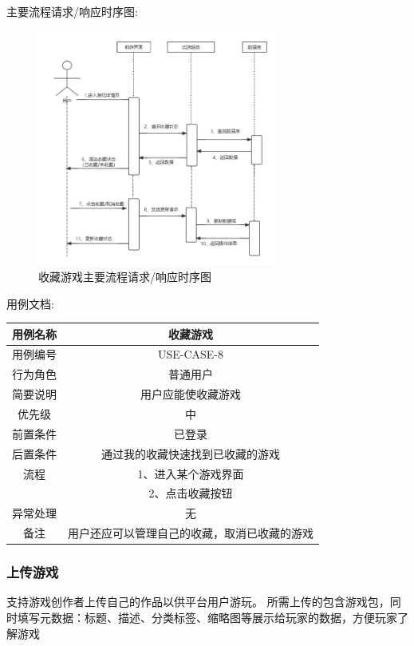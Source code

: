 \documentclass[12pt]{ctexart} %
\begin{document}
主要流程请求/响应时序图:
\begin{figure}[ht]
  \centering
  \includegraphics[width=0.7\textwidth]{yongli8.jpg}
  \caption{收藏游戏主要流程请求/响应时序图}
\end{figure}
用例文档:

\begin{tabular}{|c|c|}
  \hline
  用例名称& 收藏游戏\\
  \hline
  用例编号 & USE-CASE-8\\
  \hline
  行为角色 & 普通用户\\
  \hline
  简要说明 & 用户应能使收藏游戏\\
  \hline
  优先级 & 中\\
  \hline
  前置条件 & 已登录\\
  \hline
  后置条件 & 通过我的收藏快速找到已收藏的游戏\\
  \hline
  流程 & 1、进入某个游戏界面\\
      &  2、点击收藏按钮\\
  \hline
  异常处理 & 无\\
  \hline
  备注 & 用户还应可以管理自己的收藏，取消已收藏的游戏\\
  \hline
\end{tabular}

\subsubsection{上传游戏}
支持游戏创作者上传自己的作品以供平台用户游玩。
所需上传的包含游戏包，同时填写元数据：标题、描述、分类标签、缩略图等展示给玩家的数据，方便玩家了解游戏
\end{document}
